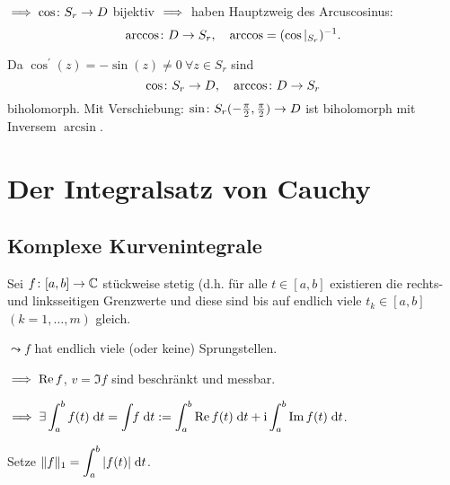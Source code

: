 \documentclass[a4paper,twoside,DIV15,BCOR12mm]{scrbook}
\begin{document}
$\implies\cos\colon S_r\rightarrow D$ bijektiv $\implies$ haben Hauptzweig des Arcuscosinus:
\[\arccos\colon D\rightarrow S_r,\quad\arccos = (\cos|_{S_r})^{-1}.\]

Da $\cos^\prime(z) = -\sin(z) \neq 0\ \forall z\in S_r$ sind
\[\cos\colon S_r\rightarrow D,\quad\arccos\colon D\rightarrow S_r\]
biholomorph. Mit Verschiebung: $\sin\colon S_r(-\frac{\pi}{2},\frac{\pi}{2})\rightarrow D$ ist biholomorph mit Inversem $\arcsin$.

\chapter{Der Integralsatz von Cauchy}
\section{Komplexe Kurvenintegrale}

Sei $f\colon [a,b]\rightarrow \mathbb{C}$ stückweise stetig (d.h. für alle $t\in[a,b]$ existieren die rechts- und linksseitigen Grenzwerte und diese sind bis auf endlich viele $t_k\in[a,b]$ $(k=1,\dotsc,m)$ gleich.

$\leadsto f$ hat endlich viele (oder keine) Sprungstellen.

$\implies\operatorname{Re}{f}$, $v=\Im{f}$ sind beschränkt und messbar.

$\displaystyle\implies\exists\int_{a}^{b}{f(t)}\;\mathrm{d} t = \int_{}^{}{\!\!f}\;\mathrm{d} t := \int_{a}^{b}{\operatorname{Re}{f(t)}}\;\mathrm{d} t + \mathrm{i}\int_{a}^{b}{\operatorname{Im}{f(t)}}\;\mathrm{d} t$.

Setze $\displaystyle \|f\|_1 = \int_{a}^{b}{|f(t)|}\;\mathrm{d} t$.
\end{document}
